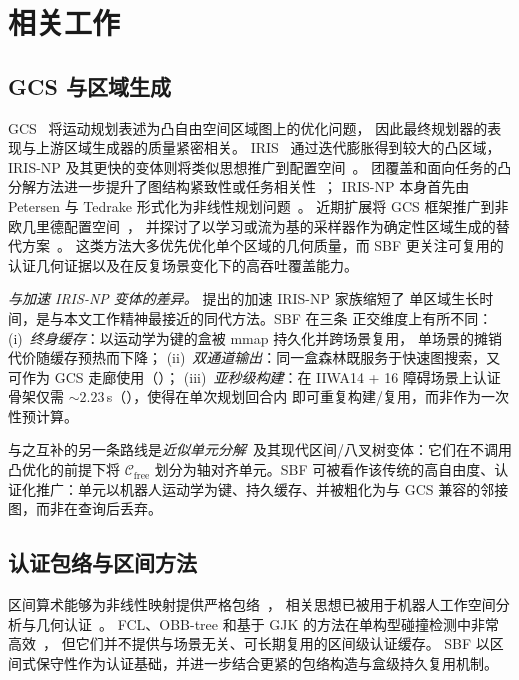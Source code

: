 \documentclass[journal]{IEEEtran}
\newcommand{\Cfree}{\mathcal{C}_{\mathrm{free}}}
\begin{document}
\section{相关工作}
\label{sec:related}

\subsection{GCS 与区域生成}

GCS~\cite{marcucci2024motion} 将运动规划表述为凸自由空间区域图上的优化问题，
因此最终规划器的表现与上游区域生成器的质量紧密相关。
IRIS~\cite{deits2015computing} 通过迭代膨胀得到较大的凸区域，
IRIS-NP 及其更快的变体则将类似思想推广到配置空间~\cite{werner2024fast,werner2024irisze}。
团覆盖和面向任务的凸分解方法进一步提升了图结构紧致性或任务相关性~\cite{amice2024clique,werner2024vcd}；
IRIS-NP 本身首先由 Petersen 与 Tedrake 形式化为非线性规划问题~\cite{petersen2023growing}。
近期扩展将 GCS 框架推广到非欧几里德配置空间~\cite{cohn2023noneuclidean}，
并探讨了以学习或流为基的采样器作为确定性区域生成的替代方案~\cite{wu2024flowgcs}。
这类方法大多优先优化单个区域的几何质量，而 SBF 更关注可复用的认证几何证据以及在反复场景变化下的高吞吐覆盖能力。

\emph{与加速 IRIS-NP 变体的差异。}
\cite{werner2024fast,werner2024irisze} 提出的加速 IRIS-NP 家族缩短了
单区域生长时间，是与本文工作精神最接近的同代方法。SBF 在三条
正交维度上有所不同：
(i)~\emph{终身缓存}：以运动学为键的盒被 mmap 持久化并跨场景复用，
单场景的摊销代价随缓存预热而下降；
(ii)~\emph{双通道输出}：同一盒森林既服务于快速图搜索，又可作为
GCS 走廊使用（）；
(iii)~\emph{亚秒级构建}：在 IIWA14 + 16 障碍场景上认证骨架仅需
${\sim}2.23$\,s（），使得在单次规划回合内
即可重复构建/复用，而非作为一次性预计算。

与之互补的另一条路线是\emph{近似单元分解}~\cite{lozanoperez1983spatial,brooks1985subdivision}及其现代区间/八叉树变体：它们在不调用凸优化的前提下将 $\Cfree$ 划分为轴对齐单元。SBF 可被看作该传统的高自由度、认证化推广：单元以机器人运动学为键、持久缓存、并被粗化为与 GCS 兼容的邻接图，而非在查询后丢弃。

\subsection{认证包络与区间方法}

区间算术能够为非线性映射提供严格包络~\cite{moore2009introduction,jaulin2001applied}，
相关思想已被用于机器人工作空间分析与几何认证~\cite{merlet2004solving,merlet2006interval}。
FCL、OBB-tree 和基于 GJK 的方法在单构型碰撞检测中非常高效~\cite{pan2012fcl,gottschalk1996obbtree,gilbert1988fast}，
但它们并不提供与场景无关、可长期复用的区间级认证缓存。
SBF 以区间式保守性作为认证基础，并进一步结合更紧的包络构造与盒级持久复用机制。
\end{document}
